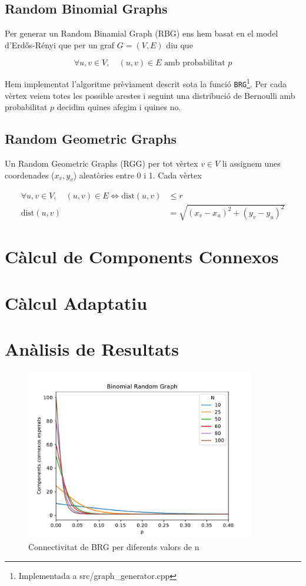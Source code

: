 \subsection{Random Binomial Graphs}
Per generar un Random Binamial Graph (RBG) ens hem basat en el model d'Erdős-Rényi \cite{Erdos1960OnGraphs,Erdos1959OnI} que per un graf $G=(V,E)$ diu que

\begin{equation}
    \forall u,v \in V,\quad (u,v) \in E \text{ amb probabilitat } p
\end{equation}

Hem implementat l'algoritme prèviament descrit sota la funció \texttt{BRG}\footnote{Implementada a src/graph\_generator.cpp}. Per cada vèrtex veiem totes les possible arestes i seguint una distribució de Bernoulli amb probabilitat $p$ decidim quines afegim i quines no.

\subsection{Random Geometric Graphs}
Un Random Geometric Graphs (RGG)\cite{noauthor_random_2019-1} per tot vèrtex $v \in V$ li assignem unes coordenades ($x_v, y_v$) aleatòries entre 0 i 1. Cada vèrtex 

\begin{align}
    \forall u,v \in V,\quad (u,v) \in E \Longleftrightarrow \text{dist}(u,v) &\leq r \\
    \text{dist}(u,v) &= \sqrt{\left(x_v - x_u\right)^2 + \left(y_v - y_u\right)^2}
\end{align}

\section{Càlcul de Components Connexos}

\section{Càlcul Adaptatiu}

\section{Anàlisis de Resultats}

\begin{figure}[H]
    \centering
    \includegraphics[width=10cm]{figures/bin_graph_04.pdf}
    \caption{Connectivitat de BRG per diferents valors de n}
    \label{fig:connect_04}
\end{figure}

\pagebreak

\printbibliography


